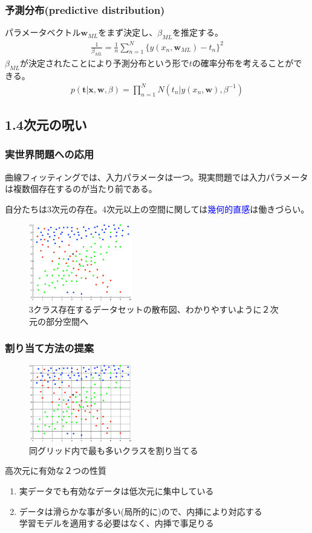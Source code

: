 \documentclass[dvipdfmx]{beamer}
\theoremstyle{definition}
\begin{document}
\begin{frame}
  \frametitle{予測分布(predictive distribution)}
  パラメータベクトル$\bm{w}_{ML}$をまず決定し、$\beta_{ML}$を推定する。
  \begin{gather*}
    \frac{1}{\beta_{ML}}=\frac{1}{n} \sum_{n=1}^{N} \{ y(x_n,\bm{w}_{ML})- t_n \}^2
  \end{gather*}
  $\beta_{ML}$が決定されたことにより予測分布という形で$t$の確率分布を考えることができる。
  \begin{gather*}
    p(\bm{t}|\bm{x},\bm{w},\beta)=\prod_{n=1}^{N} N(t_n | y(x_n,\bm{w}),\beta^{-1})
  \end{gather*}
\end{frame}

\subsection{1.4次元の呪い}
\begin{frame}
  \frametitle{実世界問題への応用}
  曲線フィッティングでは、入力パラメータは一つ。現実問題では入力パラメータは複数個存在するのが当たり前である。
  
  自分たちは3次元の存在。4次元以上の空間に関しては\textcolor{blue}{幾何的直感}は働きづらい。
  \begin{figure}[htb]
    \centering
    \includegraphics[width=4.5cm,clip]{res/curse_dim.eps}
    \caption{3クラス存在するデータセットの散布図、わかりやすいように２次元の部分空間へ}
  \end{figure}
\end{frame}

\begin{frame}
  \frametitle{割り当て方法の提案}
  \begin{figure}[htb]
    \centering
    \includegraphics[width=4.5cm,clip]{res/curse_dim_grid.eps}
    \caption{同グリッド内で最も多いクラスを割り当てる}
  \end{figure}
  高次元に有効な２つの性質
  \begin{enumerate}
    \item 実データでも有効なデータは低次元に集中している
    \item データは滑らかな事が多い(局所的に)ので、内挿により対応する \hfill \\
      学習モデルを適用する必要はなく、内挿で事足りる
  \end{enumerate}
\end{frame}
\end{document}
